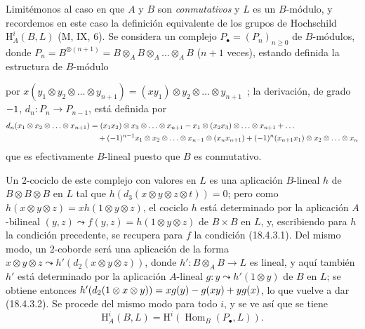 \begin{env}[18.4.4]
\label{0.18.4.4-fr}
Limitémonos al caso en que $A$ y $B$ son \emph{conmutativos} y $L$ es un
$B$-módulo, y recordemos en este caso la definición equivalente de los grupos
de Hochschild $\mathrm H_A^i(B,L)$ (M, IX, 6). Se considera un complejo
$P_\bullet=(P_n)_{n\geqslant0}$ de $B$-módulos, donde
$P_n=B^{\otimes(n+1)}=B\otimes_A B\otimes_A\ldots\otimes_A B$
($n+1$ veces), estando definida la estructura de $B$-módulo


por
$x(y_1\otimes y_2\otimes\ldots\otimes y_{n+1})=(xy_1)\otimes y_2\otimes\ldots\otimes y_{n+1}$~;
la derivación, de grado $- 1$, $d_n:P_n\to P_{n-1}$, está
definida por
\begin{align*}
  d_n(x_1\otimes x_2\otimes\ldots\otimes x_{n+1})
    &=(x_1x_2)\otimes x_3\otimes\ldots\otimes x_{n+1}
      - x_1\otimes(x_2x_3)\otimes\ldots\otimes x_{n+1}+\ldots\\
    &\quad+(- 1)^{n-1}x_1\otimes x_2\otimes\ldots\otimes x_{n-1}
      \otimes(x_nx_{n+1})
      +(- 1)^n(x_{n+1}x_1)\otimes x_2\otimes\ldots\otimes x_n
\end{align*}
que es efectivamente $B$-lineal puesto que $B$ es conmutativo.

Un $2$-cociclo de este complejo con valores en $L$ es una aplicación
$B$-lineal $h$ de $B\otimes B\otimes B$ en $L$ tal que
$h(d_3(x\otimes y\otimes z\otimes t))=0$; pero como
$h(x\otimes y\otimes z)=xh(1\otimes y\otimes z)$, el cociclo $h$ está
determinado por la aplicación $A$-bilineal
$(y,z)\leadsto f(y,z)=h(1\otimes y\otimes z)$ de $B\times B$ en $L$, y,
escribiendo para $h$ la condición precedente, se recupera para $f$ la
condición (18.4.3.1). Del mismo modo, un $2$-coborde será una aplicación de la
forma $x\otimes y\otimes z\leadsto h'(d_2(x\otimes y\otimes z))$, donde
$h':B\otimes_A B\to L$ es lineal, y aquí también $h'$ está determinado por la
aplicación $A$-lineal $g:y\leadsto h'(1\otimes y)$ de $B$ en $L$; se
obtiene entonces
$h'(d_2(1\otimes x\otimes y))=xg(y)- g(xy)+yg(x)$, lo que vuelve a dar
(18.4.3.2). Se procede del mismo modo para todo $i$, y se ve así que se tiene
\begin{equation}
\label{0.18.4.4.1-fr}
\tag{18.4.4.1}
  \mathrm H_A^i(B,L)=\mathrm H^i(\operatorname{Hom}_B(P_\bullet,L)).
\end{equation}
\end{env}

